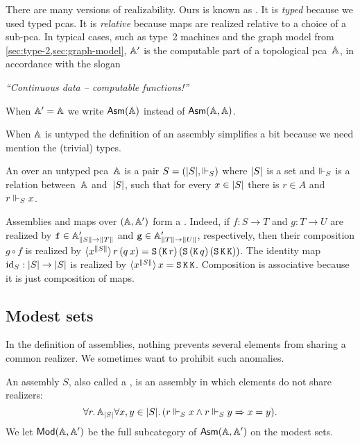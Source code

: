 There are many versions of realizability. Ours is known as . It is \emph{typed}
because we used typed pcas. It is \emph{relative} because maps are realized relative to a choice of a sub-pca. In
typical cases, such as type~2 machines and the graph model from \cref{sec:type-2,sec:graph-model}, $\subAA$ is the
computable part of a topological pca~$\AA$, in accordance with the slogan
%
\begin{center}
  \emph{``Continuous data -- computable functions!''}
\end{center}

When $\subAA = \AA$ we write $\Asm{\AA}$ instead of $\Asm{\AA,\AA}$.

When $\AA$ is untyped the definition of an assembly simplifies a bit because we need mention the (trivial) types.

\begin{definition}
  An  over an untyped pca~$\AA$ is a pair $S = (\S{S}, {\rz[S]})$ where $\S{S}$ is a set and $\rz[S]$ is a relation between~$\AA$ and~$\S{S}$, such that for every $x \in \S{S}$ there is $r \in A$ and $r \rz[S] x$.
\end{definition}

Assemblies and maps over $(\AA, \subAA)$ form a .
%
Indeed, if $f : S \to T$ and $g : T \to U$ are realized by $\R{f} \in \subAtyp{\T{S} \to \T{T}}$
and $\R{g} \in \subAtyp{\T{T} \to \T{U}}$, respectively, then their composition $g \circ f$ is realized by
$\tpcalam{x}{\T{S}}{r\,(q\,x)} = \combS\,(\combK\,r)\,(\combS\,(\combK\,q)\,(\combS\,\combK\,\combK))$.
%
The identity map $\id[S] : \S{S} \to \S{S}$ is realized by $\tpcalam{x}{\T{S}}{x} = \combS\,\combK\,\combK$. 
%
Composition is associative because it is just composition of maps.

\subsection{Modest sets}
\label{sec:modest-sets}

In the definition of assemblies, nothing prevents several elements from sharing a common realizer. We sometimes want
to prohibit such anomalies.

\begin{definition}
  An  assembly $S$, also called a , is an assembly in which elements do not share realizers:
  \begin{equation*}
    \all{r}{\xAtyp{S}}{
      \all{x,y \in \S{S}}
      (r \rz[S] x \land r \rz[S] y \lthen x = y)
    }.
  \end{equation*}
  We let $\ModA$ be the full subcategory of $\AsmA$ on the modest sets.
\end{definition}

